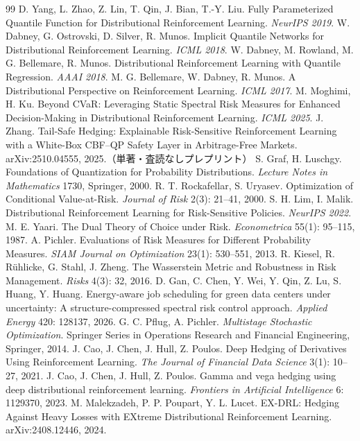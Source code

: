 \documentclass[a4paper,10pt]{jsarticle}
\theoremstyle{definition}
\begin{document}
\begin{thebibliography}{99}
 D. Yang, L. Zhao, Z. Lin, T. Qin, J. Bian, T.-Y. Liu.
Fully Parameterized Quantile Function for Distributional Reinforcement Learning. \textit{NeurIPS 2019}.
 W. Dabney, G. Ostrovski, D. Silver, R. Munos.
Implicit Quantile Networks for Distributional Reinforcement Learning. \textit{ICML 2018}.
 W. Dabney, M. Rowland, M. G. Bellemare, R. Munos.
Distributional Reinforcement Learning with Quantile Regression. \textit{AAAI 2018}.
 M. G. Bellemare, W. Dabney, R. Munos.
A Distributional Perspective on Reinforcement Learning. \textit{ICML 2017}.
 M. Moghimi, H. Ku.
Beyond CVaR: Leveraging Static Spectral Risk Measures for Enhanced Decision-Making in Distributional Reinforcement Learning. \textit{ICML 2025}.
 J. Zhang.
Tail-Safe Hedging: Explainable Risk-Sensitive Reinforcement Learning with a White-Box CBF--QP Safety Layer in Arbitrage-Free Markets.
arXiv:2510.04555, 2025.（単著・査読なしプレプリント）
 S. Graf, H. Luschgy.
Foundations of Quantization for Probability Distributions. \textit{Lecture Notes in Mathematics} 1730, Springer, 2000.
 R. T. Rockafellar, S. Uryasev.
Optimization of Conditional Value-at-Risk. \textit{Journal of Risk} 2(3): 21--41, 2000.
 S. H. Lim, I. Malik.
Distributional Reinforcement Learning for Risk-Sensitive Policies. \textit{NeurIPS 2022}.
 M. E. Yaari.
The Dual Theory of Choice under Risk. \textit{Econometrica} 55(1): 95--115, 1987.
 A. Pichler.
Evaluations of Risk Measures for Different Probability Measures. \textit{SIAM Journal on Optimization} 23(1): 530--551, 2013.
 R. Kiesel, R. R{\"u}hlicke, G. Stahl, J. Zheng.
The Wasserstein Metric and Robustness in Risk Management. \textit{Risks} 4(3): 32, 2016.
 D. Gan, C. Chen, Y. Wei, Y. Qin, Z. Lu, S. Huang, Y. Huang.
Energy-aware job scheduling for green data centers under uncertainty: A structure-compressed spectral risk control approach. \textit{Applied Energy} 420: 128137, 2026.
 G. C. Pflug, A. Pichler.
\textit{Multistage Stochastic Optimization}. Springer Series in Operations Research and Financial Engineering, Springer, 2014.
 J. Cao, J. Chen, J. Hull, Z. Poulos.
Deep Hedging of Derivatives Using Reinforcement Learning. \textit{The Journal of Financial Data Science} 3(1): 10--27, 2021.
 J. Cao, J. Chen, J. Hull, Z. Poulos.
Gamma and vega hedging using deep distributional reinforcement learning. \textit{Frontiers in Artificial Intelligence} 6: 1129370, 2023.
 M. Malekzadeh, P. P. Poupart, Y. L. Lucet.
EX-DRL: Hedging Against Heavy Losses with EXtreme Distributional Reinforcement Learning. arXiv:2408.12446, 2024.
\end{thebibliography}
\end{document}
